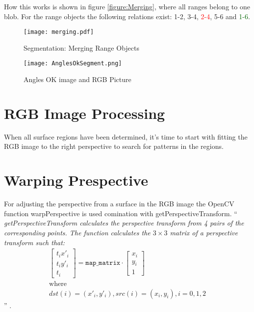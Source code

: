 How this works is shown in figure \vref{figure:Merging}, where all ranges belong to one blob. For the range objects
the following relations exist: 1-2, 3-4, \textcolor{red}{2-4}, 5-6 and \textcolor{darkgreen}{1-6}.

\begin{figure}[H]
\begin{center}
  \texttt{[image: merging.pdf]}
  \caption{Segmentation: Merging Range Objects}
  \label{figure:Merging}
\end{center}
\end{figure}
 



\begin{figure}[H]
\begin{center}
  \texttt{[image: AnglesOkSegment.png]}
  \caption[Angles OK Image and RGB Picture]{Angles OK image and RGB Picture\footnotemark}
  \label{figure:AnglesOKSeg}
\end{center}
\end{figure}
\newpage

\section{RGB Image Processing}

When all surface regions have been determined, it's time to start with fitting the RGB image 
to the right perspective to search for patterns in the regions. 


\section{Warping Prespective}
For adjusting the perspective from a surface in the RGB image the OpenCV function warpPerspective
 is used comination with getPerspectiveTransform.
``\textit{
getPerspectiveTransform calculates the perspective transform from 4 pairs of the corresponding points. The function 
calculates the $3 \times 3$ matrix of a perspective transform such that:
\begin{gather}
\begin{bmatrix} t_i x'_i \\ t_i y'_i \\ t_i \end{bmatrix} = \texttt{map\_matrix} \cdot \begin{bmatrix} x_i \\ y_i \\ 1 \end{bmatrix} 
\nonumber\\\mbox{where}\nonumber\\dst(i)=(x'_i,y'_i), src(i)=(x_i, y_i), i=0,1,2 
\end{gather}
}''
\cite{willowgarage:opencv:getPerspectiveTransform}.

